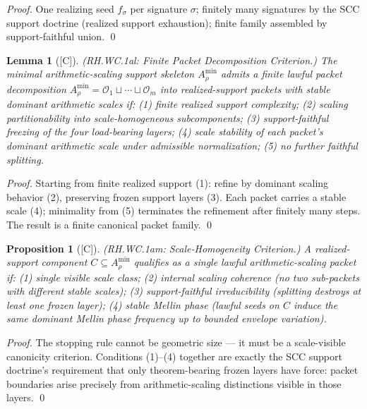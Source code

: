 \documentclass[12pt,oneside]{amsbook}
\theoremstyle{plain}
\newtheorem{lemma}[theorem]{Lemma}
\newtheorem{proposition}[theorem]{Proposition}
\theoremstyle{definition}
\theoremstyle{remark}
\newcommand{\status}[1]{\textup{[#1]}}
\begin{document}
\begin{proof}
One realizing seed $f_\sigma$ per signature $\sigma$; finitely many
signatures by the SCC support doctrine (realized support
exhaustion); finite family assembled by support-faithful union. \qed
\end{proof}

\begin{lemma}[\status{C}]\label{lem:rh-wc1al}
\textup{(RH.WC.1al: Finite Packet Decomposition Criterion.)}
The minimal arithmetic-scaling support skeleton $A_\rho^{\min}$
admits a finite lawful packet decomposition
$A_\rho^{\min} = \mathcal{O}_1 \sqcup \cdots \sqcup \mathcal{O}_m$
into realized-support packets with stable dominant arithmetic scales
if: (1) finite realized support complexity; (2) scaling
partitionability into scale-homogeneous subcomponents; (3)
support-faithful freezing of the four load-bearing layers; (4)
scale stability of each packet's dominant arithmetic scale under
admissible normalization; (5) no further faithful splitting.
\end{lemma}

\begin{proof}
Starting from finite realized support (1): refine by dominant
scaling behavior (2), preserving frozen support layers (3). Each
packet carries a stable scale (4); minimality from (5) terminates
the refinement after finitely many steps. The result is a finite
canonical packet family. \qed
\end{proof}

\begin{proposition}[\status{C}]\label{prop:rh-wc1am}
\textup{(RH.WC.1am: Scale-Homogeneity Criterion.)}
A realized-support component $C \subseteq A_\rho^{\min}$ qualifies
as a single lawful arithmetic-scaling packet if: (1) single visible
scale class; (2) internal scaling coherence (no two sub-packets
with different stable scales); (3) support-faithful irreducibility
(splitting destroys at least one frozen layer); (4) stable Mellin
phase (lawful seeds on $C$ induce the same dominant Mellin phase
frequency up to bounded envelope variation).
\end{proposition}

\begin{proof}
The stopping rule cannot be geometric size --- it must be a
scale-visible canonicity criterion. Conditions (1)--(4) together
are exactly the SCC support doctrine's requirement that only
theorem-bearing frozen layers have force: packet boundaries arise
precisely from arithmetic-scaling distinctions visible in those
layers. \qed
\end{proof}
\end{document}
